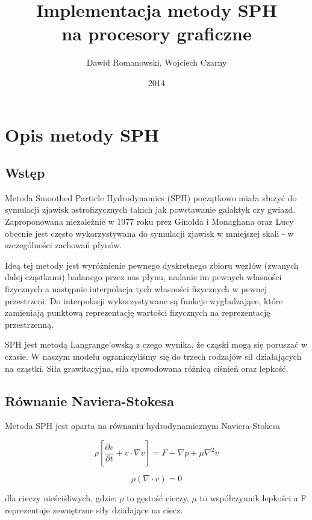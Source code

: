 \documentclass[polish, 12pt]{aghthesis}
\author{Dawid Romanowski, Wojciech Czarny}
\title{Implementacja metody SPH \\ na procesory graficzne}
\date{2014}
\begin{document}
\raggedbottom
\maketitle{}

\tableofcontents
\clearpage

	\section{Opis metody SPH}

		\subsection{Wstęp}
			
			Metoda Smoothed Particle Hydrodynamics (SPH) początkowo miała służyć do symulacji zjawisk astrofizycznych takich jak powstawanie galaktyk czy gwiazd. Zaproponowana niezależnie w 1977 roku prez Ginolda i Monaghana oraz Lucy obecnie jest często wykorzystywana do symulacji zjawisk w mniejszej skali - w szczególności zachowań płynów. 

			Ideą tej metody jest wyróżnienie pewnego dyskretnego zbioru węzłów (zwanych dalej cząstkami) badanego przez nas płynu, nadanie im pewnych własności fizycznych a następnie interpolacja tych własności fizycznych w pewnej przestrzeni. Do interpolacji wykorzystywane są funkcje wygładzające, które zamieniają punktową reprezentację wartości fizycznych na reprezentację przestrzenną.

			SPH jest metodą Langrange'owską z czego wynika, że cząski mogą się poruszać w czasie. W naszym modelu ograniczyliśmy się do trzech rodzajów sił działających na cząstki. Siła grawitacyjna, siła spowodowana różnicą ciśnień oraz lepkość.

		\subsection{Równanie Naviera-Stokesa}

			Metoda SPH jest oparta na równaniu hydrodynamicznym Naviera-Stokesa

			\[{\rho}[\frac{\partial v}{\partial t} + v \cdot \nabla v ]= F - \nabla p + \mu \nabla^2 v \label{eq:navier-stokes} \tag{1}\]

			\[{\rho}(\nabla \cdot v)=0 \label{eq:continuity} \tag{2}\]

			dla cieczy nieściśliwych, gdzie: ${\rho}$ to gęstość cieczy, ${\mu}$ to współczynnik lepkości a F reprezentuje zewnętrzne siły działające na ciecz.
			
\end{document}
